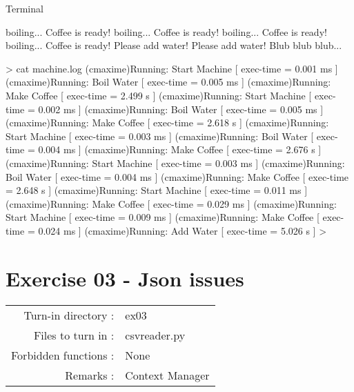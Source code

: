 \documentclass[]{article}
\newenvironment{Shaded}{\begin{snugshade}}{\end{snugshade}}
\newcommand{\NormalTok}[1]{\textcolor[rgb]{0.81,0.81,0.76}{#1}}
\begin{document}
Terminal

\begin{Shaded}
\begin{Highlighting}[]
\NormalTok{boiling...}
\NormalTok{Coffee is ready!}
\NormalTok{boiling...}
\NormalTok{Coffee is ready!}
\NormalTok{boiling...}
\NormalTok{Coffee is ready!}
\NormalTok{boiling...}
\NormalTok{Coffee is ready!}
\NormalTok{Please add water!}
\NormalTok{Please add water!}
\NormalTok{Blub blub blub...}
\end{Highlighting}
\end{Shaded}

\begin{Shaded}
\begin{Highlighting}[]
\NormalTok{> cat machine.log}
\NormalTok{(cmaxime)Running: Start Machine     [ exec-time = 0.001 ms ]}
\NormalTok{(cmaxime)Running: Boil Water        [ exec-time = 0.005 ms ]}
\NormalTok{(cmaxime)Running: Make Coffee       [ exec-time = 2.499 s  ]}
\NormalTok{(cmaxime)Running: Start Machine     [ exec-time = 0.002 ms ]}
\NormalTok{(cmaxime)Running: Boil Water        [ exec-time = 0.005 ms ]}
\NormalTok{(cmaxime)Running: Make Coffee       [ exec-time = 2.618 s  ]}
\NormalTok{(cmaxime)Running: Start Machine     [ exec-time = 0.003 ms ]}
\NormalTok{(cmaxime)Running: Boil Water        [ exec-time = 0.004 ms ]}
\NormalTok{(cmaxime)Running: Make Coffee       [ exec-time = 2.676 s  ]}
\NormalTok{(cmaxime)Running: Start Machine     [ exec-time = 0.003 ms ]}
\NormalTok{(cmaxime)Running: Boil Water        [ exec-time = 0.004 ms ]}
\NormalTok{(cmaxime)Running: Make Coffee       [ exec-time = 2.648 s  ]}
\NormalTok{(cmaxime)Running: Start Machine     [ exec-time = 0.011 ms ]}
\NormalTok{(cmaxime)Running: Make Coffee       [ exec-time = 0.029 ms ]}
\NormalTok{(cmaxime)Running: Start Machine     [ exec-time = 0.009 ms ]}
\NormalTok{(cmaxime)Running: Make Coffee       [ exec-time = 0.024 ms ]}
\NormalTok{(cmaxime)Running: Add Water         [ exec-time = 5.026 s  ]}
\NormalTok{>}
\end{Highlighting}
\end{Shaded}

\clearpage

\hypertarget{exercise-03---json-issues-1}{%
\section{Exercise 03 - Json issues}\label{exercise-03---json-issues-1}}

\begin{longtable}[]{@{}rl@{}}
\toprule
\endhead
Turn-in directory : & ex03\tabularnewline
Files to turn in : & csvreader.py\tabularnewline
Forbidden functions : & None\tabularnewline
Remarks : & Context Manager\tabularnewline
\bottomrule
\end{longtable}
\end{document}
